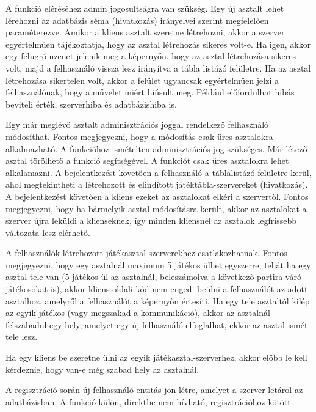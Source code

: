 A funkció eléréséhez admin jogosultságra van szükség. Egy új asztalt lehet lérehozni az adatbázis séma (hivatkozás) irányelvei szerint megfelelően paraméterezve. Amikor a kliens asztalt szeretne létrehozni, akkor a szerver egyértelműen tájékoztatja, hogy az asztal létrehozás sikeres volt-e. Ha igen, akkor egy felugró üzenet jelenik meg a képernyőn, hogy az asztal létrehozása sikeres volt, majd a felhasználó vissza lesz irányítva a tábla listázó felületre. Ha az asztal létrehozása sikertelen volt, akkor a felület ugyancsak egyértelműen jelzi a felhasználónak, hogy a művelet miért hiúsult meg. Például előfordulhat hibás beviteli érték, szerverhiba és adatbázishiba is.

Egy már meglévő asztalt adminisztrációs joggal rendelkező felhasználó módosíthat. Fontos megjegyezni, hogy a módosítás csak üres asztalokra alkalmazható.
A funkcióhoz ismételten adminisztrációs jog szükséges. Már létező asztal törölhető a funkció segítségével. A funkciót csak üres asztalokra lehet alkalamazni.
A bejelentkezést követően a felhasználó a táblalistázó felületre kerül, ahol megtekintheti a létrehozott és elindított játéktábla-szervereket (hivatkozás). A bejelentkezést követően a kliens ezeket az asztalokat elkéri a szervertől. Fontos megjegyezni, hogy ha bármelyik asztal módosításra került, akkor az asztalokat a szerver újra leküldi a klienseknek, így minden kliensnél az asztalok legfrissebb változata lesz elérhető.

A felhasználók létrehozott játékasztal-szerverekhez csatlakozhatnak. Fontos megjegyezni, hogy egy asztalnál maximum 5 játékos ülhet egyszerre, tehát ha egy asztal tele van (5 játékos ül az asztalnál, beleszámolva a következő partira váró játékosokat is), akkor kliens oldali kód nem engedi beülni a felhasználót az adott asztalhoz, amelyről a felhasználót a képernyőn értesíti. Ha egy tele asztaltól kilép az egyik játékos (vagy megszakad a kommunikáció), akkor az asztalnál felszabadul egy hely, amelyet egy új felhasználó elfoglalhat, ekkor az asztal ismét tele lesz.

Ha egy kliens be szeretne ülni az egyik játékasztal-szerverhez, akkor előbb le kell kérdeznie, hogy van-e még szabad hely az asztalnál.

A regisztráció során új felhasználó entitás jön létre, amelyet a szerver letárol az adatbázisban. A funkció külön, direktbe nem hívható, regisztrációhoz kötött.

